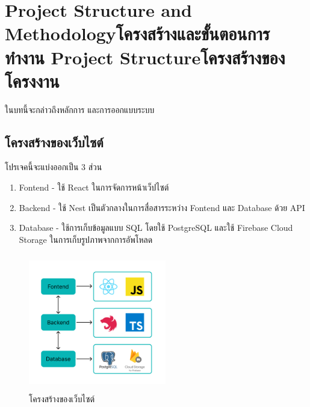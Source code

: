 \chapter{\ifproject%
\ifenglish Project Structure and Methodology\else โครงสร้างและขั้นตอนการทำงาน\fi
\else%
\ifenglish Project Structure\else โครงสร้างของโครงงาน\fi
\fi
}

ในบทนี้จะกล่าวถึงหลักการ และการออกแบบระบบ

\makeatletter


\makeatother

\section{โครงสร้างของเว็บไซต์}
โปรเจคนี้จะแบ่งออกเป็น 3 ส่วน
\begin{enumerate}
  \item Fontend - ใช้ React ในการจัดการหน้าเว็ปไซต์
  \item Backend - ใช้ Nest เป็นตัวกลางในการสื่อสารระหว่าง Fontend และ Database ด้วย API
  \item Database - ใช้การเก็บข้อมูลแบบ SQL โดยใช้ PostgreSQL และใช้ Firebase Cloud Storage ในการเก็บรูปภาพจากการอัพโหลด
\end{enumerate}


\begin{figure}[h]
  \begin{center}
  \includegraphics[width=6cm,height=6cm,keepaspectratio]{SWA.png}
  \end{center}
  \caption[โครงสร้างของเว็บไซต์]{โครงสร้างของเว็บไซต์}
  \label{fig:โครงสร้างของเว็บไซต์}
\end{figure}

